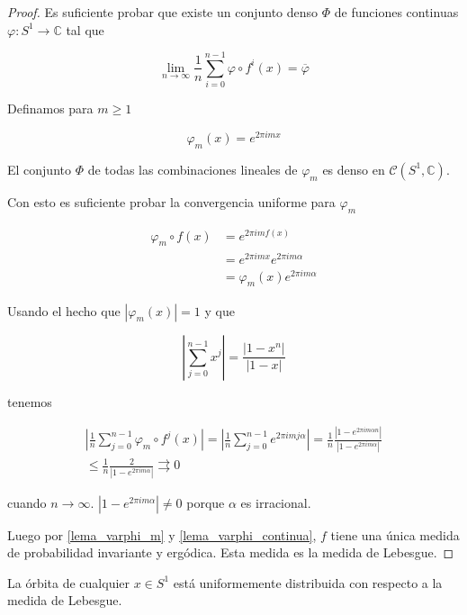 \begin{proof}
	Es suficiente probar que existe un conjunto denso $\Phi$ de funciones continuas $\varphi: S^1 \rightarrow \mathbb{C}$ tal que
	
	\begin{equation}
		\lim_{n \rightarrow \infty} \frac{1}{n} \sum_{i=0}^{n-1} \varphi \circ f^i(x) = \overline{\varphi}
	\end{equation}
	
	Definamos para $m \geq 1$
	
	\begin{equation}
		\varphi_m(x) = e^{2\pi imx}
	\end{equation}
	
	El conjunto $\Phi$ de todas las combinaciones lineales de $\varphi_m$ es denso en $\mathcal{C}(S^1,\mathbb{C})$.
	
	Con esto es suficiente probar la convergencia uniforme para $\varphi_m$
	
	\begin{align}
		\varphi_m \circ f(x) &= e^{2\pi imf(x)}\\
		&= e^{2\pi imx} e^{2\pi im\alpha}\\
		&= \varphi_m(x) e^{2\pi im\alpha}
	\end{align}
	
	Usando el hecho que $|\varphi_m(x)|=1$ y que
	
	\begin{equation}
		\left| \sum_{j=0}^{n-1} x^j \right| = \frac{|1-x^n|}{|1-x|}
	\end{equation}
	
	tenemos
	
	\begin{multline}
		\left| \frac{1}{n} \sum_{j=0}^{n-1} \varphi_m \circ f^j(x) \right| = \left| \frac{1}{n} \sum_{j=0}^{n-1} e^{2\pi imj\alpha} \right| = \frac{1}{n} \frac{|1-e^{2\pi im\alpha n}|}{|1-e^{2\pi im\alpha}|}\\
		\leq \frac{1}{n} \frac{2}{|1-e^{2\pi im\alpha}|}
		\rightrightarrows 0
	\end{multline}
	
	cuando $n \rightarrow \infty$. $|1-e^{2\pi im\alpha}| \neq 0$ porque $\alpha$ es irracional.
	
	Luego por \ref{lema_varphi_m} y \ref{lema_varphi_continua}, $f$ tiene una única medida de probabilidad invariante y ergódica. Esta medida es la medida de Lebesgue.
\end{proof}

\begin{teorema}\label{dist_uniforme}
  La órbita de cualquier $ x \in S^1 $ está uniformemente distribuida con respecto a la medida de Lebesgue.
\end{teorema}

